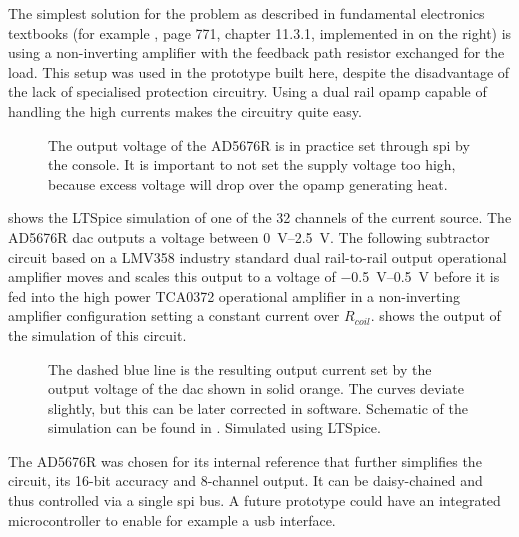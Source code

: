 The simplest solution for the problem as described in fundamental electronics textbooks (for example , page 771, chapter 11.3.1, implemented in  on the right) is using a non-inverting amplifier with the feedback path resistor exchanged for the load. This setup was used in the prototype built here, despite the disadvantage of the lack of specialised protection circuitry. Using a dual rail \acrshort{opamp} capable of handling the high currents makes the circuitry quite easy.

\begin{figure}[hbt]
    \centering
    
    \caption{ The output voltage of the AD5676R is in practice set through \acrshort{spi} by the console. It is important to not set the supply voltage too high, because excess voltage will drop over the \acrshort{opamp} generating heat.}
\end{figure}

 shows the LTSpice simulation of one of the 32 channels of the current source. The AD5676R \acrfull{dac} outputs a voltage between \qtyrange{0}{2.5}{\volt}. The following subtractor circuit based on a LMV358 industry standard dual rail-to-rail output operational amplifier moves and scales this output to a voltage of \qtyrange{-0.5}{+0.5}{\volt} before it is fed into the high power TCA0372 operational amplifier in a non-inverting amplifier configuration setting a constant current over \(R_{coil}\).  shows the output of the simulation of this circuit.

\begin{figure}[hbt]
    \centering
    
    \caption{ The dashed blue line is the resulting output current set by the output voltage of the \acrshort{dac} shown in solid orange. The curves deviate slightly, but this can be later corrected in software. Schematic of the simulation can be found in . Simulated using LTSpice.}
\end{figure}

The AD5676R was chosen for its internal reference that further simplifies the circuit, its 16-bit accuracy and 8-channel output. It can be daisy-chained and thus controlled via a single \acrshort{spi} bus. A future prototype could have an integrated microcontroller to enable for example a \acrshort{usb} interface.

